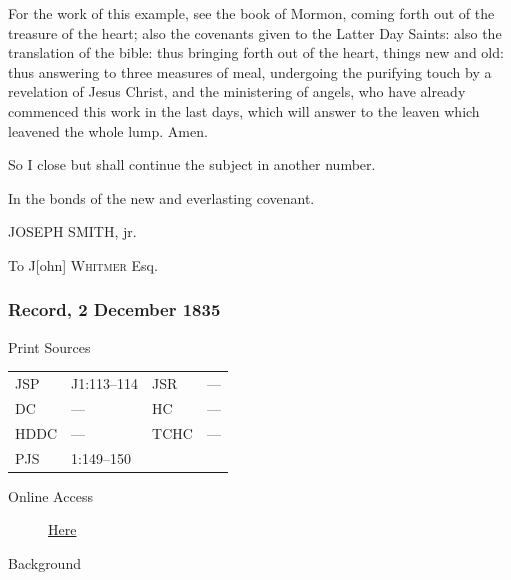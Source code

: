 				For the work of this example, see the book of Mormon, coming forth out of the treasure of the heart; also the covenants given to the Latter Day Saints: also the translation of the bible: thus bringing forth out of the heart, things new and old: thus answering to three measures of meal, undergoing the purifying touch by a revelation of Jesus Christ, and the ministering of angels, who have already commenced this work in the last days, which will answer to the leaven which leavened the whole lump. Amen.

				So I close but shall continue the subject in another number.

				In the bonds of the new and everlasting covenant.

				\begin{tightright}
				JOSEPH SMITH, jr.
				\end{tightright}

				To J[ohn] \textsc{Whitmer} Esq.
				
		\subsubsection{Record, 2 December 1835}
			\label{EMS-1835-JS-2-DEC-1835}
			
			\begin{description}
				\item[Print Sources]
			\end{description}

				\begin{tabular}{p{0.5in}p{1in}p{0.5in}p{1in}}
				JSP	 	& J1:113--114		& JSR 		& --- \\
				DC	 	& --- 				& HC 		& --- \\
				HDDC 	& ---				& TCHC 		& --- \\
				PJS 	& 1:149--150			& 	 		&  \\
				\end{tabular}
			
			\begin{description}
				\item[Online Access] \href{https://www.josephsmithpapers.org/paper-summary/journal-1835-1836/54}{Here}
			\end{description}
			
			\begin{description}
				\item[Background]
			\end{description}
			
